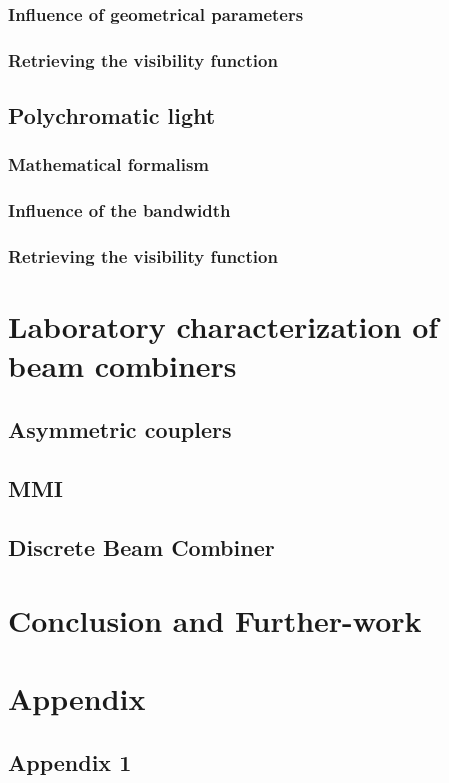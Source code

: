 \documentclass[a4paper,twoside,11pt]{article}
\makeatletter
\newcommand\backmatter{%
  \if@openright
    \clearpage
  \else
    \clearpage
  \fi
   }
\makeatother
\begin{document}
        \subsubsection{Influence of geometrical parameters}
        
        
        \subsubsection{Retrieving the visibility function}
        
    
    \subsection{Polychromatic light}
    
        \subsubsection{Mathematical formalism}
        
        
        \subsubsection{Influence of the bandwidth}
        
        
        \subsubsection{Retrieving the visibility function}
        

\section{Laboratory characterization of beam combiners}

    \subsection{Asymmetric couplers}
    
    \subsection{MMI}
    
    \subsection{Discrete Beam Combiner}

\section*{Conclusion and Further-work}

\backmatter
\appendix
\section{Appendix}
    \subsection{Appendix 1}

\printglossary
    


\end{document}
